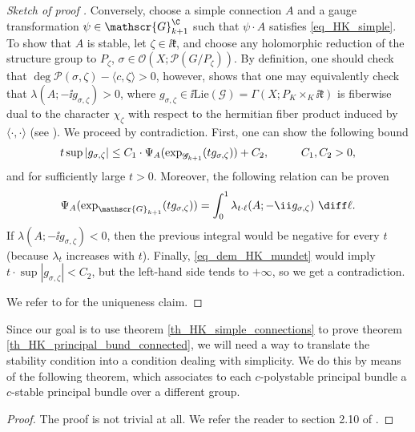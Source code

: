 \begin{proof}[\textit{Sketch of proof } \parencite{i1999hitchin}]
    Conversely, choose a simple connection \(A\) and a gauge transformation \(\psi \in \mathscr{G}^\C_{k+1}\) such that \(\psi\cdot A\) satisfies \eqref{eq_HK_simple}. To show that \(A\) is stable, let \(\zeta \in \ii \mathfrak{k}\), and choose any holomorphic reduction of the structure group to \(P_\zeta\), \(\sigma \in \mathcal{O}(X; \mathcal{P}(G/P_\zeta))\). By definition, one should check that \(\deg \mathcal{P}(\sigma, \zeta)-\langle c, \zeta\rangle >0\), however, \parencite[Lemma 4.3]{i1999hitchin} shows that one may equivalently check that \(\lambda(A;-\ii g_{\sigma,\zeta})>0\), where \(g_{\sigma, \zeta} \in \ii \mathrm{Lie}(\mathscr{G})=\Gamma(X; P_K \times_K \ii \mathfrak{k})\) is fiberwise dual to the character \(\chi_\zeta\) with respect to the hermitian fiber product induced by \(\langle \cdot, \cdot \rangle\) (see \parencite[Sec. 2.7]{i1999hitchin}). We proceed by contradiction. First, one can show the following bound \parencite[Sec. 6.3]{i1999hitchin}
    \begin{equation} \label{eq_dem_HK_mundet}
    t \sup |g_{\sigma, \zeta}| \leq C_1 \cdot \Psi_A(\exp_{\mathscr{G}_{k+1}}(t g_{\sigma,\zeta})) + C_2, \hspace{1 cm} C_1, C_2>0,
    \end{equation}
    and for sufficiently large \(t>0\). Moreover, the following relation can be proven 
    \[
    \Psi_A(\exp_{\mathscr{G}_{k+1}}( t g_{\sigma, \zeta}))=\int_0^1 \lambda_{t\cdot\ell} (A; -\ii g_{\sigma, \zeta}) \ \diff \ell.
    \]
    If \(\lambda(A; -\ii g_{\sigma, \zeta})<0\), then the previous integral would be negative for every \(t\) (because \(\lambda_t\) increases with \(t\)). Finally, \eqref{eq_dem_HK_mundet} would imply \(t\cdot \sup|g_{\sigma, \zeta}|<C_2\), but the left-hand side tends to \(+\infty\), so we get a contradiction.  

    We refer to \parencite{i1999hitchin} for the uniqueness claim.
\end{proof}

Since our goal is to use theorem \ref{th_HK_simple_connections} to prove theorem \ref{th_HK_principal_bund_connected}, we will need a way to translate the stability condition into a condition dealing with simplicity. We do this by means of the following theorem, which associates to each \(c\)-polystable principal bundle a \(c\)-stable principal bundle over a different group.

\begin{proof}
    The proof is not trivial at all. We refer the reader to section 2.10 of \parencite{garcia2009hitchin}.
\end{proof}

